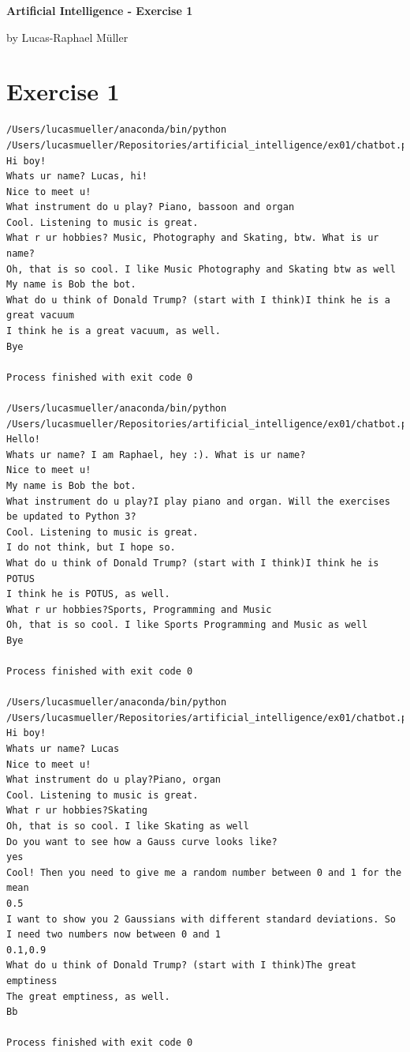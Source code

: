 \documentclass[11pt,a4paper,twoside]{article}
\begin{document}
\renewcommand\thesubsection{\alph{subsection})}

\lstset {
language = bash,
	breaklines = true,
	breakatwhitespace = true
}

\centerline{\LARGE \textbf{Artificial Intelligence - Exercise 1}}\vspace{0.5em}
\centerline{\large by Lucas-Raphael Müller}\vspace{2em}

\section*{Exercise 1}
\begin{lstlisting}
/Users/lucasmueller/anaconda/bin/python /Users/lucasmueller/Repositories/artificial_intelligence/ex01/chatbot.py
Hi boy!
Whats ur name? Lucas, hi!
Nice to meet u!
What instrument do u play? Piano, bassoon and organ
Cool. Listening to music is great.
What r ur hobbies? Music, Photography and Skating, btw. What is ur name?
Oh, that is so cool. I like Music Photography and Skating btw as well
My name is Bob the bot.
What do u think of Donald Trump? (start with I think)I think he is a great vacuum
I think he is a great vacuum, as well.
Bye

Process finished with exit code 0

/Users/lucasmueller/anaconda/bin/python /Users/lucasmueller/Repositories/artificial_intelligence/ex01/chatbot.py
Hello!
Whats ur name? I am Raphael, hey :). What is ur name?
Nice to meet u!
My name is Bob the bot.
What instrument do u play?I play piano and organ. Will the exercises be updated to Python 3?
Cool. Listening to music is great.
I do not think, but I hope so.
What do u think of Donald Trump? (start with I think)I think he is POTUS
I think he is POTUS, as well.
What r ur hobbies?Sports, Programming and Music
Oh, that is so cool. I like Sports Programming and Music as well
Bye

Process finished with exit code 0

/Users/lucasmueller/anaconda/bin/python /Users/lucasmueller/Repositories/artificial_intelligence/ex01/chatbot.py
Hi boy!
Whats ur name? Lucas
Nice to meet u!
What instrument do u play?Piano, organ
Cool. Listening to music is great.
What r ur hobbies?Skating
Oh, that is so cool. I like Skating as well
Do you want to see how a Gauss curve looks like? 
yes
Cool! Then you need to give me a random number between 0 and 1 for the mean 
0.5
I want to show you 2 Gaussians with different standard deviations. So I need two numbers now between 0 and 1 
0.1,0.9
What do u think of Donald Trump? (start with I think)The great emptiness
The great emptiness, as well.
Bb

Process finished with exit code 0
\end{lstlisting}
\end{document}
